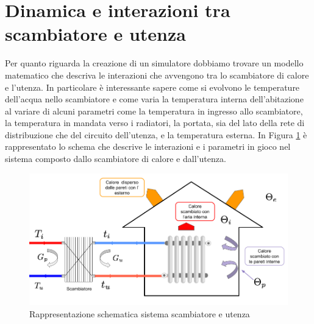 \documentclass[laurea,oneside,11pt]{USiena_tesiLM}
\begin{document}
\section{Dinamica e interazioni tra scambiatore e utenza}
Per quanto riguarda la creazione di un simulatore dobbiamo trovare un modello matematico che descriva le interazioni che avvengono tra lo scambiatore di calore e l'utenza. In particolare è interessante sapere come si evolvono le temperature dell'acqua nello scambiatore e come varia la temperatura interna dell'abitazione al variare di alcuni parametri come la temperatura in ingresso allo scambiatore, la temperatura in mandata verso i radiatori, la portata, sia del lato della rete di distribuzione che del circuito dell'utenza, e la temperatura esterna.
In Figura \ref{fig:scamb_utenza} è rappresentato lo schema che descrive le interazioni e i parametri in gioco nel sistema composto dallo scambiatore di calore e dall'utenza. 

\begin{figure}[h]
\begin{center}
\includegraphics[width=\textwidth]{figure/scamb_utenza} %
\caption{Rappresentazione schematica sistema scambiatore e utenza}
\label{fig:scamb_utenza}
\end{center}
\end{figure}
\end{document}
